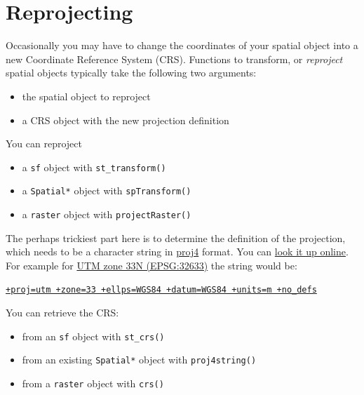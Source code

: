 \documentclass[]{book}
\providecommand{\tightlist}{%
  \setlength{\itemsep}{0pt}\setlength{\parskip}{0pt}}
\begin{document}
\section{Reprojecting}\label{reprojecting}

Occasionally you may have to change the coordinates of your spatial
object into a new Coordinate Reference System (CRS). Functions to
transform, or \emph{reproject} spatial objects typically take the
following two arguments:

\begin{itemize}
\tightlist
\item
  the spatial object to reproject
\item
  a CRS object with the new projection definition
\end{itemize}

You can reproject

\begin{itemize}
\tightlist
\item
  a \texttt{sf} object with \texttt{st\_transform()}\\
\item
  a \texttt{Spatial*} object with \texttt{spTransform()}\\
\item
  a \texttt{raster} object with \texttt{projectRaster()}
\end{itemize}

The perhaps trickiest part here is to determine the definition of the
projection, which needs to be a character string in
\href{http://trac.osgeo.org/proj/}{proj4} format. You can
\href{http://www.spatialreference.org}{look it up online}. For example
for \href{http://spatialreference.org/ref/epsg/wgs-84-utm-zone-33n/}{UTM
zone 33N (EPSG:32633)} the string would be:

\href{http://spatialreference.org/ref/epsg/wgs-84-utm-zone-33n/proj4js/}{\texttt{+proj=utm\ +zone=33\ +ellps=WGS84\ +datum=WGS84\ +units=m\ +no\_defs}}

You can retrieve the CRS:

\begin{itemize}
\tightlist
\item
  from an \texttt{sf} object with \texttt{st\_crs()}
\item
  from an existing \texttt{Spatial*} object with \texttt{proj4string()}
\item
  from a \texttt{raster} object with \texttt{crs()}
\end{itemize}
\end{document}
